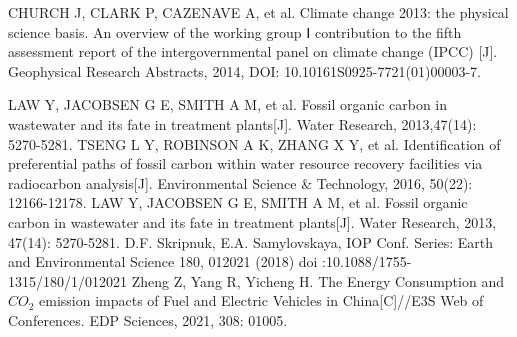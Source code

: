 \documentclass{apmcmthesis}
\begin{document}
\begin{thebibliography}{9}
CHURCH J, CLARK P, CAZENAVE A, et al. Climate change 2013:
the physical science basis. An overview of the working group Ⅰ
contribution to the fifth assessment report of the intergovernmental
panel on climate change (IPCC) [J]. Geophysical Research Abstracts,
2014, DOI: 10.10161S0925-7721(01)00003-7.

LAW Y, JACOBSEN G E, SMITH A M, et al. Fossil organic carbon in wastewater and its fate in treatment plants[J].  Water Research, 2013,47(14): 5270-5281.
 TSENG L Y, ROBINSON A K, ZHANG X Y, et al. Identification of preferential paths of fossil carbon within water resource recovery facilities via radiocarbon analysis[J]. Environmental Science \& Technology, 2016, 50(22): 12166-12178.
LAW Y, JACOBSEN G E, SMITH A M, et al. Fossil organic carbon in
wastewater and its fate in treatment plants[J]. Water Research, 2013,
47(14): 5270-5281.
D.F. Skripnuk, E.A. Samylovskaya, IOP Conf. Series: Earth and Environmental Science 180, 012021 (2018) doi :10.1088/1755-1315/180/1/012021
Zheng Z, Yang R, Yicheng H. The Energy Consumption and $CO_2$ emission impacts of Fuel and Electric Vehicles in China[C]//E3S Web of Conferences. EDP Sciences, 2021, 308: 01005.






\end{thebibliography}


\end{document}
